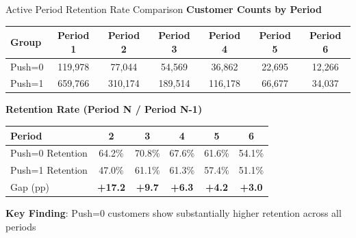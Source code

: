 \documentclass[aspectratio=169]{beamer}  %
\begin{document}
\begin{frame}{Active Period Retention Rate Comparison}
\textbf{Customer Counts by Period}
\begin{table}
\centering
\scriptsize
\begin{tabular}{lcccccc}
\toprule
Group & Period 1 & Period 2 & Period 3 & Period 4 & Period 5 & Period 6 \\
\midrule
Push=0 & 119,978 & 77,044 & 54,569 & 36,862 & 22,695 & 12,266 \\
Push=1 & 659,766 & 310,174 & 189,514 & 116,178 & 66,677 & 34,037 \\
\bottomrule
\end{tabular}
\end{table}

\vspace{0.2cm}

\textbf{Retention Rate (Period N / Period N-1)}
\begin{table}
\centering
\scriptsize
\begin{tabular}{lccccc}
\toprule
Period & 2 & 3 & 4 & 5 & 6 \\
\midrule
Push=0 Retention & 64.2\% & 70.8\% & 67.6\% & 61.6\% & 54.1\% \\
Push=1 Retention & 47.0\% & 61.1\% & 61.3\% & 57.4\% & 51.1\% \\
\midrule
Gap (pp) & \textbf{+17.2} & \textbf{+9.7} & \textbf{+6.3} & \textbf{+4.2} & \textbf{+3.0} \\
\bottomrule
\end{tabular}
\end{table}

\textbf{Key Finding}: Push=0 customers show substantially higher retention across all periods
\end{frame}
\end{document}
